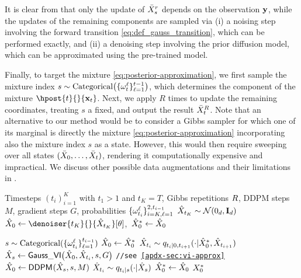 It is clear from  that only the update of $\bar{X}_s^r$ depends on the observation ${\mathbf{y}}$, while the updates of the remaining components are sampled via (i) a noising step involving the forward transition \eqref{eq:def_gauss_transition}, which can be performed exactly, and (ii) a denoising step involving the prior diffusion model, which can be approximated using the pre-trained model. 

Finally, to target the mixture \eqref{eq:posterior-approximation}, we first sample the mixture index $s \sim \mbox{Categorical}\big(\{ \omega^\ell _t \}_{\ell=1}^{t-1}\big)$, which determines the component of the mixture $\hpost{t}{}{\bx_t}$. %
Next, we apply  $R$ times to update the remaining coordinates, treating $s$ a fixed, and output the result $\bar{X}^R _t$. 
Note that an alternative to our method would be to consider a Gibbs sampler for which one of its marginal is directly the mixture 
\eqref{eq:posterior-approximation} incorporating also the mixture index $s$ as a state. However, this would then require sweeping over all states $(\bar{X}_0, \dotsc, \bar{X}_t)$, rendering it computationally expensive and impractical. We discuss other possible data augmentations and their limitations in .

\begin{algorithm}[t]
    \caption{\algoname}
    \begin{algorithmic}[1]
         Timesteps $(t_i)_{i = 1} ^K$ with $t_1 > 1$ and $t_K = T$, Gibbs repetitions ${R}$, DDPM steps $M$, gradient steps $G$, probabilities $\{\omega^\ell _{t_i}\}^{2, t_{i-1}} _{i=K, \ell=1}$
        \STATE $\hat{X}_{t_K} \sim \mathcal{N}(0_d, \mathbf{I}_d)$
        \STATE $\vX_{0} \gets \denoiser{t_K}{}{\vX_{t_K}}[\param]$, $\, \hat{X}^* _0 \gets \hat{X}_0$

            \STATE $s \sim \mbox{Categorical}(\{\omega^\ell _{t_i}\}_{\ell = 1}^{t_{i-1}})$
            \STATE $\hat{X} _0 \gets \hat{X}^* _0$ \label{line:x0init}
            \STATE $\vX _{t_i} \sim \fw{t_i|0, t_{i+1}}{\vX^{*} _0, \vX _{t_{i+1}}}{}$ \label{line:xtinit}
                \STATE $\hat{X}_s \gets \small{\mathsf{Gauss}\_\mathsf{VI}}\big(\hat{X}_0, \hat{X}_{t_i}, s, G\big)$ \label{line:gaussvi} \hfill {\small\texttt{//see \ref{apdx-sec:vi-approx}}}
                \STATE $\hat{X} _0 \gets \small{\mathsf{DDPM}}_{}(\hat{X} _s, s, M)$ \label{line:ddpm}
                \STATE $\vX _{t_i} \sim \fw{t_i|s}{\vX _s}{}$
            \ENDFOR
            \STATE $\hat{X}^* _{0} \gets \hat{X} _0$
        \ENDFOR
         $X^* _0$
    \end{algorithmic}
    \label{algo:midpoint-gibbs}
\end{algorithm}

